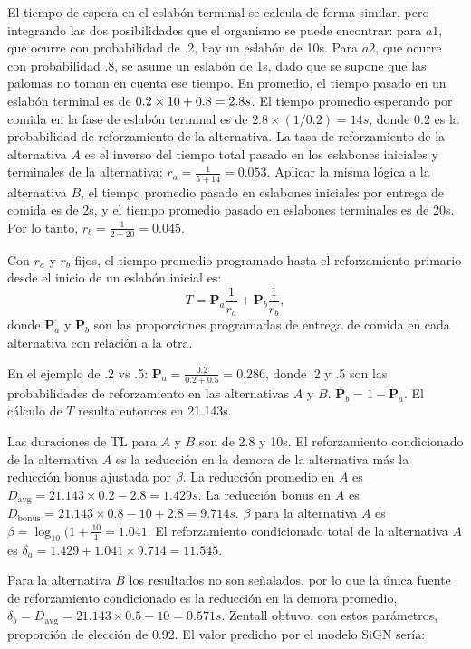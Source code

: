 \documentclass[a4paper,12pt]{article}
\begin{document}
El tiempo de espera en el eslabón terminal se calcula de forma similar, pero integrando las dos posibilidades que el organismo se puede encontrar: para $a1$, que ocurre con probabilidad de .2, hay un eslabón de 10s.
Para $a2$, que ocurre con probabilidad .8, se asume un eslabón de 1s, dado que se supone que las palomas no toman en cuenta ese tiempo.
En promedio, el tiempo pasado en un eslabón terminal es de $0.2 \times 10 + 0.8 \time 1 = 2.8s$.
El tiempo promedio esperando por comida en la fase de eslabón terminal es de $2.8 \times (1 / 0.2) = 14s$, donde 0.2 es la probabilidad de reforzamiento de la alternativa.
La tasa de reforzamiento de la alternativa $A$ es el inverso del tiempo total pasado en los eslabones iniciales y terminales de la alternativa: $r_{a} = \frac{1}{5 + 14} = 0.053$.
Aplicar la misma lógica a la alternativa $B$, el tiempo promedio pasado en eslabones iniciales por entrega de comida es de 2s, y el tiempo promedio pasado en eslabones terminales es de 20s.
Por lo tanto, $r_{b} = \frac{1}{2 + 20} = 0.045$.

Con $r_{a}$ y $r_{b}$ fijos, el tiempo promedio programado hasta el reforzamiento primario desde el inicio de un eslabón inicial es:
\[
    T = \mathbf{P}_{a} \frac{1}{r_a} + \mathbf{P}_{b}\frac{1}{r_b}
,\]
donde  $\mathbf{P}_{a}$ y  $\mathbf{P}_{b}$ son las proporciones programadas de entrega de comida en cada alternativa con relación a la otra.

En el ejemplo de .2 vs .5: $\mathbf{P}_a = \frac{0.2}{0.2 + 0.5} = 0.286$, donde .2 y .5 son las probabilidades de reforzamiento en las alternativas $A$ y $B$.
$\mathbf{P}_b = 1 - \mathbf{P}_a$.
El cálculo de $T$ resulta entonces en 21.143s.

Las duraciones de TL para $A$ y $B$ son de 2.8 y 10s.
El reforzamiento condicionado de la alternativa $A$ es la reducción en la demora de la alternativa más la reducción bonus ajustada por $\beta$.
La reducción promedio en $A$ es $D_{\mbox{avg}} = 21.143 \times 0.2 - 2.8 = 1.429s$.
La reducción bonus en $A$ es $D_{\mbox{bonus}} = 21.143 \times 0.8 - 10 + 2.8 = 9.714s$.
$\beta$ para la alternativa $A$ es $\beta = \log_{10} (1 + \frac{10}{1} = 1.041$.
El reforzamiento condicionado total de la alternativa $A$ es $\delta_a = 1.429 + 1.041 \times 9.714 = 11.545$.

Para la alternativa $B$ los resultados no son señalados, por lo que la única fuente de reforzamiento condicionado es la reducción en la demora promedio, $\delta_b = D_{\mbox{avg}} = 21.143 \times 0.5 - 10 = 0.571s$.
Zentall obtuvo, con estos parámetros, proporción de elección de 0.92.
El valor predicho por el modelo SiGN sería:
\end{document}
